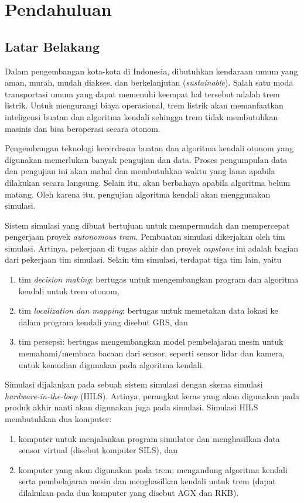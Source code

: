 \chapter{Pendahuluan}

\section{Latar Belakang}

Dalam pengembangan kota-kota di Indonesia, dibutuhkan kendaraan umum yang aman,
murah, mudah diakses, dan berkelanjutan (\textit{sustainable}). Salah satu moda
transportasi umum yang dapat memenuhi keempat hal tersebut adalah trem listrik.
Untuk mengurangi biaya operasional, trem listrik akan memanfaatkan inteligensi
buatan dan algoritma kendali sehingga trem tidak membutuhkan masinis dan bisa
beroperasi secara otonom.

Pengembangan teknologi kecerdasan buatan dan algoritma kendali otonom yang
digunakan memerlukan banyak pengujian dan data. Proses pengumpulan data dan
pengujian ini akan mahal dan membutuhkan waktu yang lama apabila dilakukan
secara langsung. Selain itu, akan berbahaya apabila algoritma belum matang. Oleh
karena itu, pengujian algoritma kendali akan menggunakan simulasi.

Sistem simulasi yang dibuat bertujuan untuk mempermudah dan mempercepat
pengerjaan proyek \textit{autonomous tram}. Pembuatan simulasi dikerjakan oleh
tim simulasi. Artinya, pekerjaan di tugas akhir dan proyek \textit{capstone} ini
adalah bagian dari pekerjaan tim simulasi. Selain tim simulasi, terdapat tiga
tim lain, yaitu
\begin{enumerate}
	\item tim \textit{decision making}: bertugas untuk mengembangkan program dan
	      algoritma kendali untuk trem otonom,
	\item tim \textit{localization dan mapping}: bertugas untuk memetakan data
	      lokasi ke dalam program kendali yang disebut GRS, dan
	\item tim persepsi: bertugas mengembangkan model pembelajaran mesin untuk
	      memahami/membaca bacaan dari sensor, seperti sensor lidar dan kamera,
	      untuk kemudian digunakan pada algoritma kendali.
\end{enumerate}

Simulasi dijalankan pada sebuah sistem simulasi dengan skema simulasi
\textit{hardware-in-the-loop} (HILS). Artinya, perangkat keras yang akan
digunakan pada produk akhir nanti akan digunakan juga pada simulasi. Simulasi
HILS membutuhkan dua komputer:
\begin{enumerate}
	\item komputer untuk menjalankan program simulator dan menghasilkan data
	      sensor virtual (disebut komputer SILS), dan
	\item komputer yang akan digunakan pada trem; mengandung algoritma
	      kendali serta pembelajaran mesin dan menghasilkan kendali untuk trem
	      (dapat dilakukan pada dua komputer yang disebut AGX dan RKB).
\end{enumerate}

